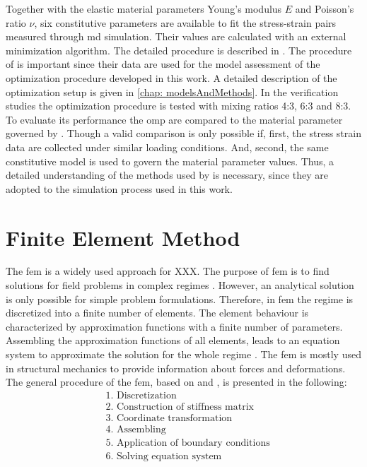 Together with the elastic material parameters Young's modulus $E$ and Poisson's ratio $\nu$, six constitutive parameters are available to fit the stress-strain pairs measured through \acrshort{md} simulation. Their values are calculated with an external minimization algorithm. The detailed procedure is described in \cite{ries_deciphering_nodate}. The procedure of \citet{ries_deciphering_nodate} is important since their data are used for the model assessment of the optimization procedure developed in this work. A detailed description of the optimization setup is given in \autoref{chap: modelsAndMethods}. In the verification studies the optimization procedure is tested with mixing ratios 4:3, 6:3 and 8:3. To evaluate its performance the \acrlong{omp} are compared to the material parameter governed by \citet{ries_deciphering_nodate}. Though a valid comparison is only possible if, first, the stress strain data are collected under similar loading conditions. And, second, the same constitutive model is used to govern the material parameter values. Thus, a detailed understanding of the methods used by \citet{ries_deciphering_nodate} is necessary, since they are adopted to the simulation process used in this work.  



\section{Finite Element Method} \label{sec: FEMBasics}

The \acrfull{fem} is a widely used approach for XXX. 
The purpose of \acrshort{fem} is to find solutions for field problems in complex regimes \cite{willner_vorlesungsskript_nodate}. However, an analytical solution is only possible for simple problem formulations. Therefore, in \acrshort{fem} the regime is discretized into a finite number of elements. The element behaviour is characterized by approximation functions with a finite number of parameters. Assembling the approximation functions of all elements, leads to an equation system to approximate the solution for the whole regime \cite{jagota_finite_nodate}. The \acrshort{fem} is mostly used in structural mechanics to provide information about forces and deformations. The general procedure of the \acrshort{fem}, based on \citet{willner_vorlesungsskript_nodate} and \citet{steinke_finite-elemente-methode_2015}, is presented in the following: 
\begin{align*}
    &\text{1. Discretization} \\
    &\text{2. Construction of stiffness matrix}\\ 
    &\text{3. Coordinate transformation} \\
    &\text{4. Assembling} \\
    &\text{5. Application of boundary conditions} \\
    &\text{6. Solving equation system}
\end{align*}

